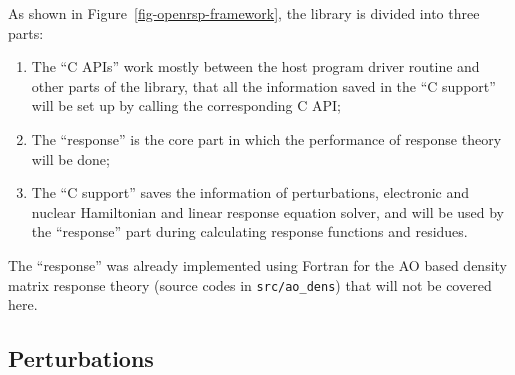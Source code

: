 As shown in Figure~\ref{fig-openrsp-framework}, the \LibName library is divided
into three parts:
\begin{enumerate}
  \item The ``\LibName C APIs'' work mostly between the host program driver
    routine and other parts of the \LibName library, that all the information
    saved in the ``\LibName C support'' will be set up by calling the
    corresponding \LibName C API;
  \item The ``\LibName response'' is the core part in which the performance
    of response theory will be done;
  \item The ``\LibName C support'' saves the information of perturbations,
    electronic and nuclear Hamiltonian and linear response equation solver,
    and will be used by the ``\LibName response'' part during calculating
    response functions and residues.
\end{enumerate}

The ``\LibName response'' was already implemented using Fortran for the AO
based density matrix response theory (source codes in \texttt{src/ao\_dens})
that will not be covered here.

\subsection{Perturbations}
\label{subsection-analysis-perturbation}

